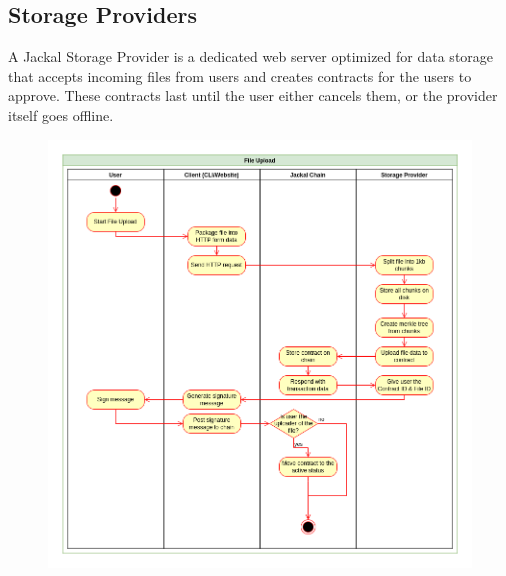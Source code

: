 \documentclass[a4paper]{article}
\begin{document}
\newpage
\subsection{Storage Providers}
A Jackal Storage Provider is a dedicated web server optimized for data storage that accepts incoming files from users and creates contracts for the users to approve. These contracts last until the user either cancels them, or the provider itself goes offline.

\begin{figure}[!htbp]
\centering
{}
\end{figure}

\begin{figure}[!htbp]
\centering
\includegraphics[width=1\textwidth]{assets/providers2.png}
\caption{}
\end{figure}
\end{document}
